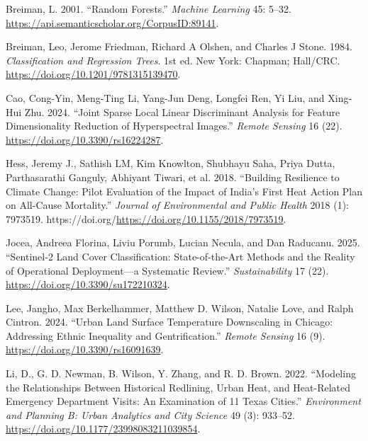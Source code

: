 \documentclass[
  letterpaper,
  DIV=11,
  numbers=noendperiod]{scrreprt}
\newlength{\cslhangindent}
\newenvironment{CSLReferences}[2] %
 {\begin{list}{}{%
  \setlength{\itemindent}{0pt}
  \setlength{\leftmargin}{0pt}
  \setlength{\parsep}{0pt}
  \ifodd #1
   \setlength{\leftmargin}{\cslhangindent}
   \setlength{\itemindent}{-1\cslhangindent}
  \fi
  \setlength{\itemsep}{#2\baselineskip}}}
 {\end{list}}
\begin{document}
\label{refs}
\begin{CSLReferences}{1}{0}
Breiman, L. 2001. {``Random Forests.''} \emph{Machine Learning} 45:
5--32. \url{https://api.semanticscholar.org/CorpusID:89141}.

Breiman, Leo, Jerome Friedman, Richard A Olshen, and Charles J Stone.
1984. \emph{Classification and Regression Trees}. 1st ed. New York:
Chapman; Hall/CRC. \url{https://doi.org/10.1201/9781315139470}.

Cao, Cong-Yin, Meng-Ting Li, Yang-Jun Deng, Longfei Ren, Yi Liu, and
Xing-Hui Zhu. 2024. {``Joint Sparse Local Linear Discriminant Analysis
for Feature Dimensionality Reduction of Hyperspectral Images.''}
\emph{Remote Sensing} 16 (22). \url{https://doi.org/10.3390/rs16224287}.

Hess, Jeremy J., Sathish LM, Kim Knowlton, Shubhayu Saha, Priya Dutta,
Parthasarathi Ganguly, Abhiyant Tiwari, et al. 2018. {``Building
Resilience to Climate Change: Pilot Evaluation of the Impact of India's
First Heat Action Plan on All-Cause Mortality.''} \emph{Journal of
Environmental and Public Health} 2018 (1): 7973519.
https://doi.org/\url{https://doi.org/10.1155/2018/7973519}.

Jocea, Andreea Florina, Liviu Porumb, Lucian Necula, and Dan Raducanu.
2025. {``Sentinel-2 Land Cover Classification: State-of-the-Art Methods
and the Reality of Operational Deployment---a Systematic Review.''}
\emph{Sustainability} 17 (22).
\url{https://doi.org/10.3390/su172210324}.

Lee, Jangho, Max Berkelhammer, Matthew D. Wilson, Natalie Love, and
Ralph Cintron. 2024. {``Urban Land Surface Temperature Downscaling in
Chicago: Addressing Ethnic Inequality and Gentrification.''}
\emph{Remote Sensing} 16 (9). \url{https://doi.org/10.3390/rs16091639}.

Li, D., G. D. Newman, B. Wilson, Y. Zhang, and R. D. Brown. 2022.
{``Modeling the Relationships Between Historical Redlining, Urban Heat,
and Heat-Related Emergency Department Visits: An Examination of 11 Texas
Cities.''} \emph{Environment and Planning B: Urban Analytics and City
Science} 49 (3): 933--52.
\url{https://doi.org/10.1177/23998083211039854}.


\end{CSLReferences}
\end{document}
